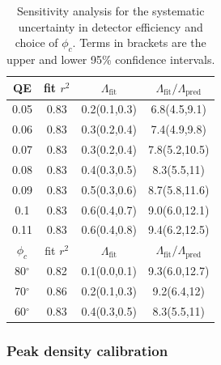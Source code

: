 	\begin{table}
		\begin{minipage}{0.5\textwidth}
		\vspace{0cm}
		{\fontsize{11}{11}\selectfont
		\begin{tabular}{c c c c}
			\hline\hline

			QE & fit $r^2$ &  $\Lambda_\textrm{fit}$ & $\Lambda_\textrm{fit}/\Lambda_\textrm{pred}$\\      
			\hline
			0.05    &   0.83   &   0.2(0.1,0.3)  &  6.8(4.5,9.1)\\
			0.06    &   0.83   &   0.3(0.2,0.4)  &  7.4(4.9,9.8)\\
			0.07    &   0.83   &   0.3(0.2,0.4)  &  7.8(5.2,10.5)\\
			0.08    &   0.83   &   0.4(0.3,0.5)  &  8.3(5.5,11)\\
			0.09    &   0.83   &   0.5(0.3,0.6)  &  8.7(5.8,11.6)\\
			0.1     &   0.83   &   0.6(0.4,0.7)  &  9.0(6.0,12.1)\\
			0.11    &   0.83   &   0.6(0.4,0.8)  &  9.4(6.2,12.5)\\
			\hline
			$\phi_c$ & fit $r^2$ &  $\Lambda_\textrm{fit}$ & $\Lambda_\textrm{fit}/\Lambda_\textrm{pred}$\\
			\hline
			80$^\circ$    &   0.82   &   0.1(0.0,0.1) &  9.3(6.0,12.7)\\
			70$^\circ$    &   0.86   &   0.2(0.1,0.3) &  9.2(6.4,12)\\
			60$^\circ$    &   0.83   &   0.4(0.3,0.5) &  8.3(5.5,11)\\
			\hline\hline
		\end{tabular}
		}
		\end{minipage}
		\hfill
		\begin{minipage}{0.5\textwidth}
		\vspace{0cm}
		\caption{Sensitivity analysis for the systematic uncertainty in detector efficiency and choice of $\phi_c$. Terms in brackets are the upper and lower 95\% confidence intervals.}
		\label{tab:choice_indep}
		\end{minipage}
	\end{table}


\subsubsection{Peak density calibration}
\label{sec:n0_cal}

